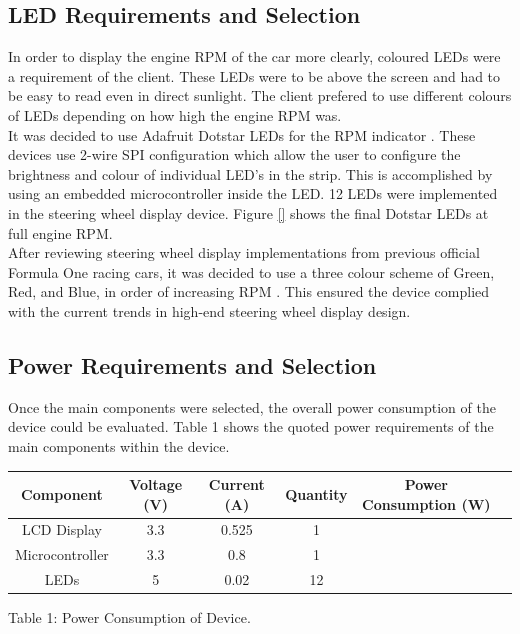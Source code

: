 \documentclass[a4paper,12pt]{article}
\begin{document}
\subsection{LED Requirements and Selection}
\label{sec:LEDs}

In order to display the engine RPM of the car more clearly, coloured LEDs were a requirement of the client. These LEDs were to be above the screen and had to be easy to read even in direct sunlight. The client prefered to use different colours of LEDs depending on how high the engine RPM was. \\

It was decided to use Adafruit Dotstar LEDs for the RPM indicator \cite{dotstar_datasheet}. These devices use 2-wire SPI configuration which allow the user to configure the brightness and colour of individual LED’s in the strip. This is accomplished by using an embedded microcontroller inside the LED. 12 LEDs were implemented in the steering wheel display device. Figure \ref{} shows the final Dotstar LEDs at full engine RPM. \\

After reviewing steering wheel display implementations from previous official Formula One racing cars, it was decided to use a three colour scheme of Green, Red, and Blue, in order of increasing RPM \cite{bsim_racing, daily_mail_1}. This ensured the device complied with the current trends in high-end steering wheel display design.

\subsection{Power Requirements and Selection}
\label{sec:PSU}

Once the main components were selected, the overall power consumption of the device could be evaluated. Table 1 shows the quoted power requirements of the main components within the device.

\begin{center}
\begin{tabular}{ | c | c | c | c | c | c | }
\hline
 Component & Voltage (V) & Current (A) & Quantity & Power Consumption (W) \\
\hline
 LCD Display & 3.3 & 0.525 & 1 & \\
\hline
 Microcontroller & 3.3 & 0.8 & 1 & \\
\hline
 LEDs & 5 & 0.02 & 12 & \\
\hline
\end{tabular}
\par
\bigskip
Table 1: Power Consumption of Device.
\end{center}
\end{document}
